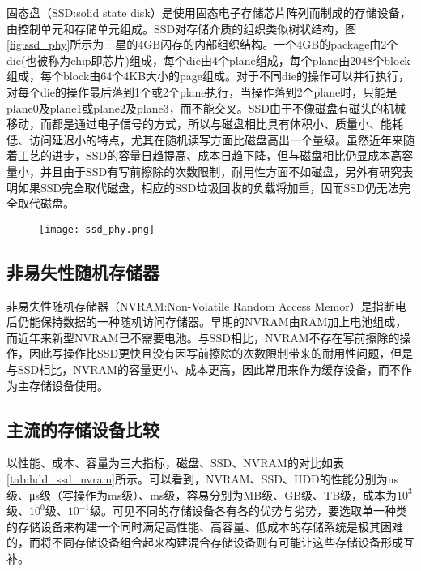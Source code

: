 固态盘（SSD:solid state disk）是使用固态电子存储芯片阵列而制成的存储设备，由控制单元和存储单元组成。SSD对存储介质的组织类似树状结构，图\ref{fig:ssd_phy}所示为三星的4GB闪存的内部组织结构\cite{agrawal2008design}。一个4GB的package由2个die(也被称为chip即芯片)组成，每个die由4个plane组成，每个plane由2048个block组成，每个block由64个4KB大小的page组成。对于不同die的操作可以并行执行，对每个die的操作最后落到1个或2个plane执行，当操作落到2个plane时，只能是plane0及plane1或plane2及plane3，而不能交叉。SSD由于不像磁盘有磁头的机械移动，而都是通过电子信号的方式，所以与磁盘相比具有体积小、质量小、能耗低、访问延迟小的特点\cite{agrawal2008design, dirik2009performance}，尤其在随机读写方面比磁盘高出一个量级。虽然近年来随着工艺的进步，SSD的容量日趋提高、成本日趋下降，但与磁盘相比仍显成本高容量小，并且由于SSD有写前擦除的次数限制，耐用性方面不如磁盘，另外有研究\cite{kgil2008improving}表明如果SSD完全取代磁盘，相应的SSD垃圾回收的负载将加重，因而SSD仍无法完全取代磁盘。

\begin{figure}[!htp]
  \centering
  \texttt{[image: ssd\_phy.png]}
  \hspace{1cm}
\end{figure}

\subsection{非易失性随机存储器}

非易失性随机存储器（NVRAM:Non-Volatile Random Access Memor）是指断电后仍能保持数据的一种随机访问存储器。早期的NVRAM由RAM加上电池组成，而近年来新型NVRAM已不需要电池。与SSD相比，NVRAM不存在写前擦除的操作，因此写操作比SSD更快且没有因写前擦除的次数限制带来的耐用性问题，但是与SSD相比，NVRAM的容量更小、成本更高，因此常用来作为缓存设备，而不作为主存储设备使用。

\subsection{主流的存储设备比较}

以性能、成本、容量为三大指标，磁盘、SSD、NVRAM的对比如表\ref{tab:hdd_ssd_nvram}所示。可以看到，NVRAM、SSD、HDD的性能分别为ns级、μs级（写操作为ms级）、ms级，容易分别为MB级、GB级、TB级，成本为$10^{3}$级、$10^{0}$级、$10^{-1}$级。可见不同的存储设备各有各的优势与劣势，要选取单一种类的存储设备来构建一个同时满足高性能、高容量、低成本的存储系统是极其困难的，而将不同存储设备组合起来构建混合存储设备则有可能让这些存储设备形成互补。

